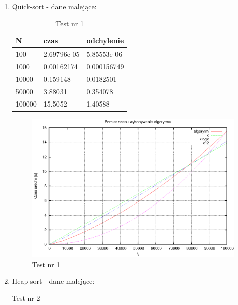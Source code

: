 \documentclass[a4paper,11pt]{article}
\begin{document}
\begin{enumerate}
 \item Quick-sort - dane malejące:
   
  \begin{table}[th]
    \caption{Test nr 1}

      \begin{tabular}{l|l|l}
	\hline
	N & czas & odchylenie \\
    \hline
 100 & 2.69796e-05 & 5.85553e-06\\
 \hline
1000 & 0.00162174 & 0.000156749\\
\hline
10000 & 0.159148 & 0.0182501\\
\hline
50000 & 3.88031 & 0.354078\\
\hline
100000 & 15.5052 & 1.40588\\


\hline
    \end{tabular}
    \end{table}
 \begin{figure}[!h]
\centering
\includegraphics[width=1\textwidth]{../prj/wykres7.eps}
\caption{Test nr 1}
\label{Test nr 1}
\end{figure} 
\newpage
 \item Heap-sort - dane malejące:
   
  \begin{table}[th]
    \caption{Test nr 2}


\end{table}
\end{enumerate}
\end{document}
